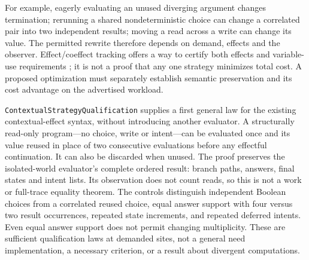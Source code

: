 \documentclass[11pt]{article}
\theoremstyle{definition}
\theoremstyle{remark}
\begin{document}
For example, eagerly evaluating an unused diverging argument changes
termination; rerunning a shared nondeterministic choice can change a correlated
pair into two independent results; moving a read across a write can change
its value. The permitted rewrite therefore depends on demand, effects and
the observer. Effect/coeffect tracking offers a way to certify both effects
and variable-use requirements \cite{TorczonEffectsCoeffects}; it is not a
proof that any one strategy minimizes total cost. A proposed optimization
must separately establish semantic preservation and its cost advantage on
the advertised workload.

\nolinkurl{ContextualStrategyQualification} supplies a first general law for
the existing contextual-effect syntax, without introducing another evaluator.
A structurally read-only program---no choice, write or intent---can be
evaluated once and its value reused in place of two consecutive evaluations
before any effectful continuation. It can also be discarded when unused.
The proof preserves the isolated-world evaluator's complete ordered result:
branch paths, answers, final states and intent lists. Its observation does
not count reads, so this is not a work or full-trace equality theorem.
The controls distinguish independent Boolean choices from a correlated reused
choice, equal answer support with four versus two result occurrences, repeated
state increments, and repeated deferred intents. Even equal answer support
does not permit changing multiplicity. These are sufficient qualification
laws at demanded sites, not a general need implementation, a necessary
criterion, or a result about divergent computations.
\end{document}
